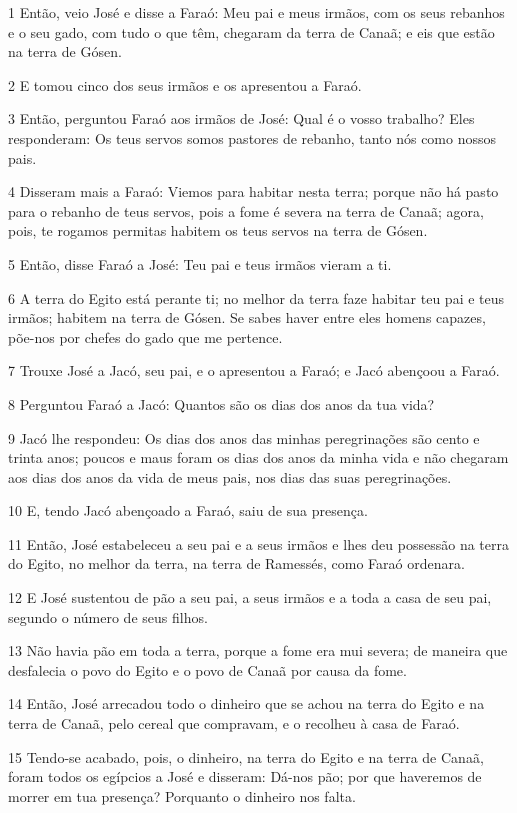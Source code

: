 \par 1 Então, veio José e disse a Faraó: Meu pai e meus irmãos, com os seus rebanhos e o seu gado, com tudo o que têm, chegaram da terra de Canaã; e eis que estão na terra de Gósen.
\par 2 E tomou cinco dos seus irmãos e os apresentou a Faraó.
\par 3 Então, perguntou Faraó aos irmãos de José: Qual é o vosso trabalho? Eles responderam: Os teus servos somos pastores de rebanho, tanto nós como nossos pais.
\par 4 Disseram mais a Faraó: Viemos para habitar nesta terra; porque não há pasto para o rebanho de teus servos, pois a fome é severa na terra de Canaã; agora, pois, te rogamos permitas habitem os teus servos na terra de Gósen.
\par 5 Então, disse Faraó a José: Teu pai e teus irmãos vieram a ti.
\par 6 A terra do Egito está perante ti; no melhor da terra faze habitar teu pai e teus irmãos; habitem na terra de Gósen. Se sabes haver entre eles homens capazes, põe-nos por chefes do gado que me pertence.
\par 7 Trouxe José a Jacó, seu pai, e o apresentou a Faraó; e Jacó abençoou a Faraó.
\par 8 Perguntou Faraó a Jacó: Quantos são os dias dos anos da tua vida?
\par 9 Jacó lhe respondeu: Os dias dos anos das minhas peregrinações são cento e trinta anos; poucos e maus foram os dias dos anos da minha vida e não chegaram aos dias dos anos da vida de meus pais, nos dias das suas peregrinações.
\par 10 E, tendo Jacó abençoado a Faraó, saiu de sua presença.
\par 11 Então, José estabeleceu a seu pai e a seus irmãos e lhes deu possessão na terra do Egito, no melhor da terra, na terra de Ramessés, como Faraó ordenara.
\par 12 E José sustentou de pão a seu pai, a seus irmãos e a toda a casa de seu pai, segundo o número de seus filhos.
\par 13 Não havia pão em toda a terra, porque a fome era mui severa; de maneira que desfalecia o povo do Egito e o povo de Canaã por causa da fome.
\par 14 Então, José arrecadou todo o dinheiro que se achou na terra do Egito e na terra de Canaã, pelo cereal que compravam, e o recolheu à casa de Faraó.
\par 15 Tendo-se acabado, pois, o dinheiro, na terra do Egito e na terra de Canaã, foram todos os egípcios a José e disseram: Dá-nos pão; por que haveremos de morrer em tua presença? Porquanto o dinheiro nos falta.
